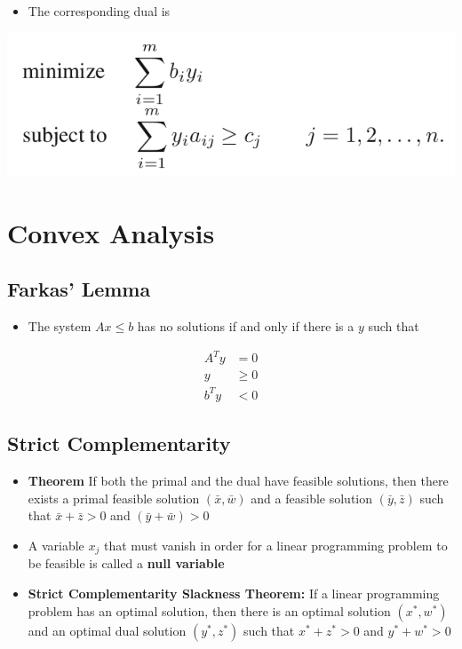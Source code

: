 \documentclass[11pt]{article}
\begin{document}
\begin{itemize}
\item The corresponding dual is
\end{itemize}
\begin{center}
\includegraphics[width=.9\linewidth]{Duality Theory/screenshot_2019-02-06_11-49-53.png}
\end{center}

\section{Convex Analysis}
\label{sec:orgabb7627}
\subsection{Farkas' Lemma}
\label{sec:org333a99f}
\begin{itemize}
\item The system \(Ax \leq b\) has no solutions if and only if there is a \(y\) such that
\end{itemize}
\begin{align*}
  A^T y &= 0\\ 
  y &\geq 0\\ 
  b^T y &< 0
\end{align*}

\subsection{Strict Complementarity}
\label{sec:org14b2d9b}
\begin{itemize}
\item \textbf{Theorem} If both the primal and the dual have feasible solutions, then there exists a primal feasible solution \((\bar x, \bar w)\) and a feasible solution \((\bar y, \bar z)\) such that \(\bar x + \bar z > 0\) and \((\bar y + \bar w) > 0\)
\item A variable \(x_j\) that must vanish in order for a linear programming problem to be feasible is called a \textbf{null variable}
\item \textbf{Strict Complementarity Slackness Theorem:} If a linear programming problem has an optimal solution, then there is an optimal solution \((x^*, w^*)\) and an optimal dual solution \((y^*,z^*)\) such that \(x^* + z^* > 0\) and \(y^* + w^* > 0\)
\end{itemize}
\end{document}

